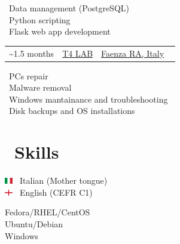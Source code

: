 \documentclass{article}
\makeatletter
\newcommand{\triple}[3]{
    \vspace{-4pt}
    \begin{tabularx}{\textwidth}{@{}>{\raggedright\arraybackslash}X >{\centering\arraybackslash}c >{\raggedleft\arraybackslash}X@{}}
    #1 & #2 & #3
    \end{tabularx}
    \vspace{-16pt}
}
\makeatother
\begin{document}
\begin{paracol}{2}
\begin{tcolorbox}[title=Software Developer Internship]
        \faDatabase \ Data management (PostgreSQL) \\
        \faPython \ Python scripting \\
        \faFlask \ Flask web app development
    \end{tcolorbox}

    \begin{tcolorbox}[title=Computer Technician Internship]
        \triple
            {\faCalendar* 2017 \textasciitilde 1.5 months}
            {\href{https://www.t4lab.it/}{T4 LAB}}
            {\href{https://www.openstreetmap.org/relation/43004}{Faenza RA, Italy} \ \faCity}
        \tcblower

        \faLaptop \ PCs repair \\
        \faShieldVirus \ Malware removal \\
        \faRecycle \ Windows mantainance and troubleshooting \\
        \faHdd \ Disk backups and OS installations
    \end{tcolorbox}

    \vfill

    \switchcolumn

    \section*{\faLightbulb \ Skills}

    \begin{tcolorbox}[title=Languages]
        \includegraphics[width=10pt]{it} \ Italian (Mother tongue) \\
        \includegraphics[width=10pt]{gb-eng} \ English (CEFR C1)
    \end{tcolorbox}

    \begin{tcolorbox}[title=Operating Systems]
        \textcolor[HTML]{EE0000}{\faRedhat} Fedora/RHEL/CentOS \\
        \textcolor[HTML]{E95420}{\faUbuntu} Ubuntu/Debian \\
        \textcolor[HTML]{0078D6}{\faWindows} Windows
    \end{tcolorbox}


\end{paracol}
\end{document}
